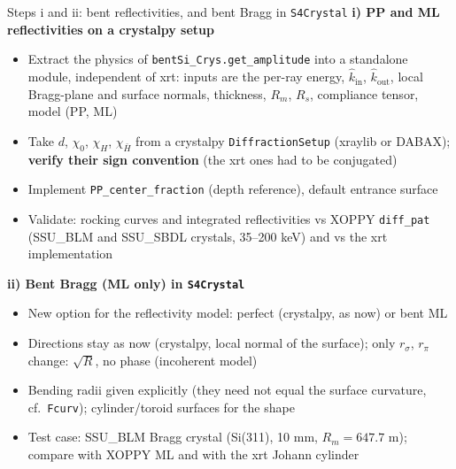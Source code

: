 \documentclass[aspectratio=169,10pt]{beamer}
\begin{document}
\begin{frame}{Steps i and ii: bent reflectivities, and bent Bragg in \texttt{S4Crystal}}
  \small
  \textbf{i) PP and ML reflectivities on a crystalpy setup}
  \begin{itemize}
    \item Extract the physics of \texttt{bentSi\_Crys.get\_amplitude} into a standalone module,
      independent of xrt: inputs are the per-ray energy, $\hat k_\mathrm{in}$, $\hat k_\mathrm{out}$,
      local Bragg-plane and surface normals, thickness, $R_m$, $R_s$, compliance tensor, model
      (PP, ML)
    \item Take $d$, $\chi_0$, $\chi_H$, $\chi_{\bar H}$ from a crystalpy \texttt{DiffractionSetup}
      (xraylib or DABAX); \textbf{verify their sign convention} (the xrt ones had to be conjugated)
    \item Implement \texttt{PP\_center\_fraction} (depth reference), default entrance surface
    \item Validate: rocking curves and integrated reflectivities vs XOPPY \texttt{diff\_pat}
      (SSU\_BLM and SSU\_SBDL crystals, 35--200 keV) and vs the xrt implementation
  \end{itemize}

  \textbf{ii) Bent Bragg (ML only) in \texttt{S4Crystal}}
  \begin{itemize}
    \item New option for the reflectivity model: perfect (crystalpy, as now) or bent ML
    \item Directions stay as now (crystalpy, local normal of the surface); only $r_\sigma$, $r_\pi$
      change: $\sqrt{R}$, no phase (incoherent model)
    \item Bending radii given explicitly (they need not equal the surface curvature, cf.\
      \texttt{Fcurv}); cylinder/toroid surfaces for the shape
    \item Test case: SSU\_BLM Bragg crystal (Si(311), 10 mm, $R_m = 647.7$ m); compare with XOPPY
      ML and with the xrt Johann cylinder
  \end{itemize}
\end{frame}
\end{document}
